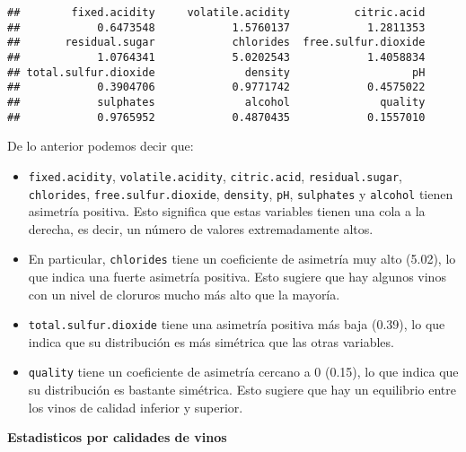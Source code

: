\documentclass[
]{article}
\begin{document}
\begin{verbatim}
##        fixed.acidity     volatile.acidity          citric.acid 
##            0.6473548            1.5760137            1.2811353 
##       residual.sugar            chlorides  free.sulfur.dioxide 
##            1.0764341            5.0202543            1.4058834 
## total.sulfur.dioxide              density                   pH 
##            0.3904706            0.9771742            0.4575022 
##            sulphates              alcohol              quality 
##            0.9765952            0.4870435            0.1557010
\end{verbatim}

De lo anterior podemos decir que:

\begin{itemize}
\item
  \texttt{fixed.acidity}, \texttt{volatile.acidity},
  \texttt{citric.acid}, \texttt{residual.sugar}, \texttt{chlorides},
  \texttt{free.sulfur.dioxide}, \texttt{density}, \texttt{pH},
  \texttt{sulphates} y \texttt{alcohol} tienen asimetría positiva. Esto
  significa que estas variables tienen una cola a la derecha, es decir,
  un número de valores extremadamente altos.
\item
  En particular, \texttt{chlorides} tiene un coeficiente de asimetría
  muy alto (5.02), lo que indica una fuerte asimetría positiva. Esto
  sugiere que hay algunos vinos con un nivel de cloruros mucho más alto
  que la mayoría.
\item
  \texttt{total.sulfur.dioxide} tiene una asimetría positiva más baja
  (0.39), lo que indica que su distribución es más simétrica que las
  otras variables.
\item
  \texttt{quality} tiene un coeficiente de asimetría cercano a 0 (0.15),
  lo que indica que su distribución es bastante simétrica. Esto sugiere
  que hay un equilibrio entre los vinos de calidad inferior y superior.
\end{itemize}

\textbf{Estadisticos por calidades de vinos}
\end{document}
